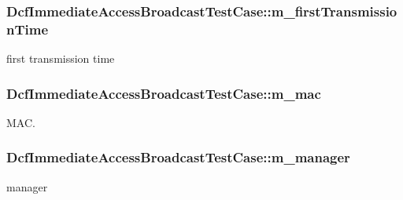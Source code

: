 \subsubsection[{\texorpdfstring{m\+\_\+first\+Transmission\+Time}{m_firstTransmissionTime}}]{ Dcf\+Immediate\+Access\+Broadcast\+Test\+Case\+::m\+\_\+first\+Transmission\+Time\hspace{0.3cm}{\ttfamily [private]}}\hypertarget{classDcfImmediateAccessBroadcastTestCase_a90fe73456a50aa8d866a4488a636da18}{}\label{classDcfImmediateAccessBroadcastTestCase_a90fe73456a50aa8d866a4488a636da18}


first transmission time 

\subsubsection[{\texorpdfstring{m\+\_\+mac}{m_mac}}]{ Dcf\+Immediate\+Access\+Broadcast\+Test\+Case\+::m\+\_\+mac\hspace{0.3cm}{\ttfamily [private]}}\hypertarget{classDcfImmediateAccessBroadcastTestCase_ab0a0eb92216037ec211e0fa87ac11d1c}{}\label{classDcfImmediateAccessBroadcastTestCase_ab0a0eb92216037ec211e0fa87ac11d1c}


M\+AC. 

\subsubsection[{\texorpdfstring{m\+\_\+manager}{m_manager}}]{ Dcf\+Immediate\+Access\+Broadcast\+Test\+Case\+::m\+\_\+manager\hspace{0.3cm}{\ttfamily [private]}}\hypertarget{classDcfImmediateAccessBroadcastTestCase_ab8f20ef6ae6e7c13de2d3e5cb95bc052}{}\label{classDcfImmediateAccessBroadcastTestCase_ab8f20ef6ae6e7c13de2d3e5cb95bc052}


manager 

